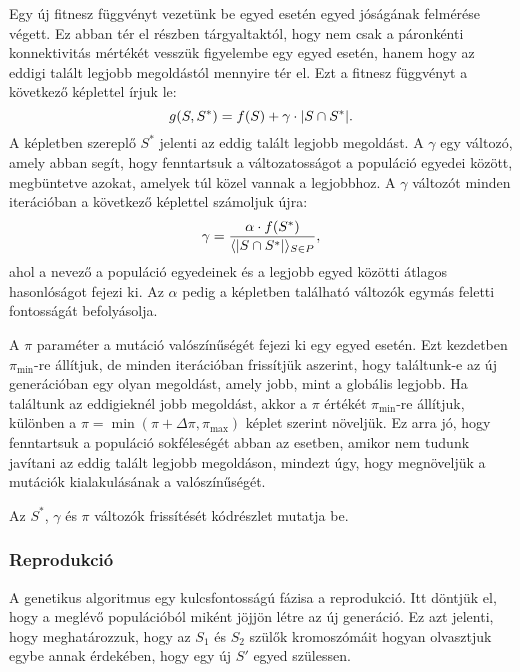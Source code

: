 Egy új fitnesz függvényt vezetünk be  egyed esetén egyed jóságának felmérése végett.
Ez abban tér el  részben tárgyaltaktól,
hogy nem csak a páronkénti konnektivitás mértékét vesszük figyelembe egy egyed esetén,
hanem hogy az eddigi talált legjobb megoldástól mennyire tér el.
Ezt a fitnesz függvényt a következő képlettel írjuk le:
\begin{equation}\label{eqn:SOCNDP_GA_FITNESZ_FUNCTION}
  g(S, S^{*}) = f(S) + \gamma \cdot \lvert S \cap S^{*}\rvert.
\end{equation}
A képletben szereplő $S^{*}$ jelenti az eddig talált legjobb megoldást.
A $\gamma$ egy változó, amely abban segít, hogy fenntartsuk a változatosságot a populáció egyedei között,
megbüntetve azokat, amelyek túl közel vannak a legjobbhoz.
A $\gamma$ változót minden iterációban a következő képlettel számoljuk újra:
\begin{equation}\label{eqn:SOCNDP_GA_GAMMA}
  \gamma = \frac{\alpha \cdot f(S^{*})}{\langle \lvert S \cap S^{*}\rvert \rangle_{S \in P}},
\end{equation}
ahol a nevező a populáció egyedeinek és a legjobb egyed közötti átlagos hasonlóságot fejezi ki.
Az $\alpha$ pedig a képletben található változók egymás feletti fontosságát befolyásolja.

A $\pi$ paraméter a mutáció valószínűségét fejezi ki egy egyed esetén.
Ezt kezdetben $\pi_{\min}$-re állítjuk, de minden iterációban frissítjük aszerint,
hogy találtunk-e az új generációban egy olyan megoldást, amely jobb, mint a globális legjobb.
Ha találtunk az eddigieknél jobb megoldást, akkor a $\pi$ értékét $\pi_{\min}$-re állítjuk,
különben a $\pi = \min \left(\pi + \Delta \pi, \pi_{\max} \right)$ képlet szerint növeljük.
Ez arra jó, hogy fenntartsuk a populáció sokféleségét abban az esetben,
amikor nem tudunk javítani az eddig talált legjobb megoldáson,
mindezt úgy, hogy megnöveljük a mutációk kialakulásának a valószínűségét.

Az $S^{*}$, $\gamma$ és $\pi$ változók frissítését  kódrészlet mutatja be.



\subsubsection{Reprodukció}
A genetikus algoritmus egy kulcsfontosságú fázisa a reprodukció.
Itt döntjük el, hogy a meglévő populációból miként jöjjön létre az új generáció.
Ez azt jelenti, hogy meghatározzuk, hogy az $S_{1}$ és $S_{2}$ szülők kromoszómáit
hogyan olvasztjuk egybe annak érdekében, hogy egy új $S'$ egyed szülessen.

